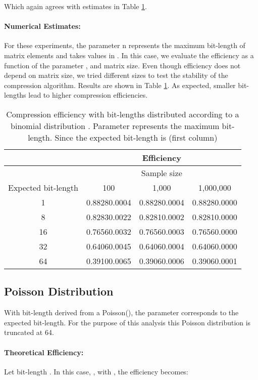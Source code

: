 \documentclass[10pt]{article}
\begin{document}
Which again agrees with estimates in Table \ref{tab:04}.

\paragraph{Numerical Estimates:}
For these experiments, the parameter n represents the maximum bit-length of matrix elements and takes values in . In this case, we evaluate the efficiency as a function of the parameter , and matrix size. Even though efficiency does not depend on matrix size, we tried different sizes to test the stability of the compression algorithm. Results are shown in Table \ref{tab:04}. As expected, smaller bit-lengths lead to higher compression efficiencies.


\begin{table}[h]
  \centering
  \caption{Compression efficiency with bit-lengths distributed according to a binomial distribution . Parameter  represents the maximum bit-length. Since  the expected bit-length is  (first column)}
   \begin{tabular}{cccc}
     \hline
     & &Efficiency& \\
     \hline
     & &Sample size& \\
     Expected bit-length  &100 &1,000 &1,000,000 \\
     \hline
     1 &0.88280.0004&0.88280.0004&0.88280.0000\\ 
     8 &0.82830.0022&0.82810.0002&0.82810.0000\\ 
     16&0.76560.0032&0.76560.0003&0.76560.0000\\ 
     32&0.64060.0045&0.64060.0004&0.64060.0000\\ 
     64&0.39100.0065&0.39060.0006&0.39060.0001\\
     \hline
  \end{tabular}
  \label{tab:04}
\end{table}

\subsection*{Poisson Distribution}
With bit-length derived from a Poisson(), the parameter  corresponds to the expected bit-length. For the purpose of this analysis this Poisson distribution is truncated at 64. 
\paragraph{Theoretical Efficiency:}
Let bit-length . In this case, , with ,  the efficiency becomes:
\end{document}

